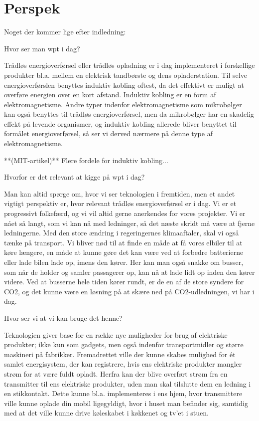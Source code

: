 \section{Perspek}

Noget der kommer lige efter indledning:

Hvor ser man wpt i dag?

Trådløs energioverførsel eller trådløs opladning er i dag implementeret i forskellige produkter bl.a. mellem en elektrisk tandbørste og dens opladerstation. Til selve energioverførslen benyttes induktiv kobling oftest, da det effektivt er muligt at overføre energien over en kort afstand. Induktiv kobling er en form af elektromagnetisme. Andre typer indenfor elektromagnetisme som mikrobølger kan også benyttes til trådløs energioverførsel, men da mikrobølger har en skadelig effekt på levende organismer, og induktiv kobling allerede bliver benyttet til formålet energioverførsel, så ser vi derved nærmere på denne type af elektromagnetisme.

**(MIT-artikel)** Flere fordele for induktiv kobling...

Hvorfor er det relevant at kigge på wpt i dag?

Man kan altid spørge om, hvor vi ser teknologien i fremtiden, men et andet vigtigt perspektiv er, hvor relevant trådløs energioverførsel er i dag. Vi er et progressivt folkefærd, og vi vil altid gerne anerkendes for vores projekter. Vi er nået så langt, som vi kan nå med ledninger, så det næste skridt må være at fjerne ledningerne. Med den store ændring i regeringernes klimaaftaler, skal vi også tænke på transport. Vi bliver nød til at finde en måde at få vores elbiler til at køre længere, en måde at kunne gøre det kan være ved at forbedre batterierne eller lade bilen lade op, imens den kører. Her kan man også snakke om busser, som når de holder og samler passagerer op, kan nå at lade lidt op inden den kører videre. Ved at busserne hele tiden kører rundt, er de en af de store syndere for CO2, og det kunne være en løsning på at skære ned på CO2-udledningen, vi har i dag.

Hvor ser vi at vi kan bruge det henne?

Teknologien giver base for en række nye muligheder for brug af elektriske produkter; ikke kun som gadgets, men også indenfor transportmidler og større maskineri på fabrikker. Fremadrettet ville der kunne skabes mulighed for ét samlet energisystem, der kan registrere, hvis ens elektriske produkter mangler strøm for at være fuldt opladt. Herfra kan der blive overført strøm fra en transmitter til ens elektriske produkter, uden man skal tilslutte dem en ledning i en stikkontakt. Dette kunne bl.a. implementeres i ens hjem, hvor transmittere ville kunne oplade din mobil ligegyldigt, hvor i huset man befinder sig, samtidig med at det ville kunne drive køleskabet i køkkenet og tv'et i stuen.

